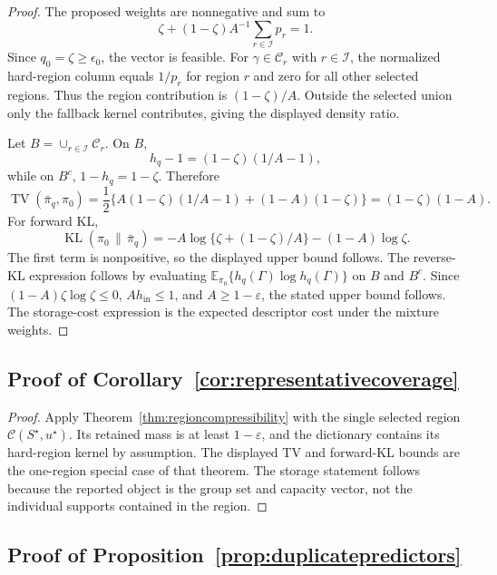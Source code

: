 \documentclass[twoside,11pt]{article}
\newcommand{\E}{\mathbb{E}}
\newcommand{\TV}{\operatorname{TV}}
\newcommand{\KL}{\operatorname{KL}}
\begin{document}
\begin{proof} The proposed weights are nonnegative and sum to
\[
\zeta+(1-\zeta)A^{-1}\sum_{r\in\mathcal I}p_r=1.
\]
Since \(q_0=\zeta\ge\epsilon_0\), the vector is feasible. For \(\gamma\in\mathcal C_r\) with \(r\in\mathcal I\), the normalized hard-region column equals \(1/p_r\) for region \(r\) and zero for all other selected regions. Thus the region contribution is \((1-\zeta)/A\). Outside the selected union only the fallback kernel contributes, giving the displayed density ratio.

Let \(B=\cup_{r\in\mathcal I}\mathcal C_r\). On \(B\),
\[
h_q-1=(1-\zeta)(1/A-1),
\]
while on \(B^c\), \(1-h_q=1-\zeta\). Therefore
\[
\TV(\bar\pi_q,\pi_0) = \frac12\{A(1-\zeta)(1/A-1)+(1-A)(1-\zeta)\} = (1-\zeta)(1-A).
\]
For forward KL,
\[
\KL(\pi_0\,\|\,\bar\pi_q) = -A\log\{\zeta+(1-\zeta)/A\}-(1-A)\log\zeta .
\]
The first term is nonpositive, so the displayed upper bound follows. The reverse-KL expression follows by evaluating \(\E_{\pi_0}\{h_q(\Gamma)\log h_q(\Gamma)\}\) on \(B\) and \(B^c\). Since \((1-A)\zeta\log\zeta\le0\), \(A h_{\mathrm{in}}\le1\), and \(A\ge1-\varepsilon\), the stated upper bound follows. The storage-cost expression is the expected descriptor cost under the mixture weights.
\end{proof}

\subsection{Proof of Corollary~\ref{cor:representativecoverage}}

\begin{proof} Apply Theorem~\ref{thm:regioncompressibility} with the single selected region \(\mathcal C(S^\star,u^\star)\). Its retained mass is at least \(1-\varepsilon\), and the dictionary contains its hard-region kernel by assumption. The displayed TV and forward-KL bounds are the one-region special case of that theorem. The storage statement follows because the reported object is the group set and capacity vector, not the individual supports contained in the region.
\end{proof}

\subsection{Proof of Proposition~\ref{prop:duplicatepredictors}}
\end{document}
